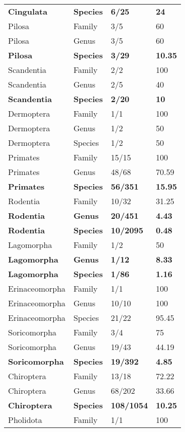 \begin{longtable}{llll}
  \textbf{Cingulata} & \textbf{Species} & \textbf{6/25} & \textbf{24} \\ 
  Pilosa & Family & 3/5 & 60 \\ 
  Pilosa & Genus & 3/5 & 60 \\ 
  \textbf{Pilosa} & \textbf{Species} & \textbf{3/29} & \textbf{10.35} \\ 
  Scandentia & Family & 2/2 & 100 \\ 
  Scandentia & Genus & 2/5 & 40 \\ 
  \textbf{Scandentia} & \textbf{Species} & \textbf{2/20} & \textbf{10} \\ 
  Dermoptera & Family & 1/1 & 100 \\ 
  Dermoptera & Genus & 1/2 & 50 \\ 
  Dermoptera & Species & 1/2 & 50 \\ 
  Primates & Family & 15/15 & 100 \\ 
  Primates & Genus & 48/68 & 70.59 \\ 
  \textbf{Primates} & \textbf{Species} & \textbf{56/351} & \textbf{15.95} \\ 
  Rodentia & Family & 10/32 & 31.25 \\ 
  \textbf{Rodentia} & \textbf{Genus} & \textbf{20/451} & \textbf{4.43} \\ 
  \textbf{Rodentia} & \textbf{Species} & \textbf{10/2095} & \textbf{0.48} \\ 
  Lagomorpha & Family & 1/2 & 50 \\ 
  \textbf{Lagomorpha} & \textbf{Genus} & \textbf{1/12} & \textbf{8.33} \\ 
  \textbf{Lagomorpha} & \textbf{Species} & \textbf{1/86} & \textbf{1.16} \\ 
  Erinaceomorpha & Family & 1/1 & 100 \\ 
  Erinaceomorpha & Genus & 10/10 & 100 \\ 
  Erinaceomorpha & Species & 21/22 & 95.45 \\ 
  Soricomorpha & Family & 3/4 & 75 \\ 
  Soricomorpha & Genus & 19/43 & 44.19 \\ 
  \textbf{Soricomorpha} & \textbf{Species} & \textbf{19/392} & \textbf{4.85} \\ 
  Chiroptera & Family & 13/18 & 72.22 \\ 
  Chiroptera & Genus & 68/202 & 33.66 \\ 
  \textbf{Chiroptera} & \textbf{Species} & \textbf{108/1054} & \textbf{10.25} \\ 
  Pholidota & Family & 1/1 & 100 \\ 

\end{longtable}
